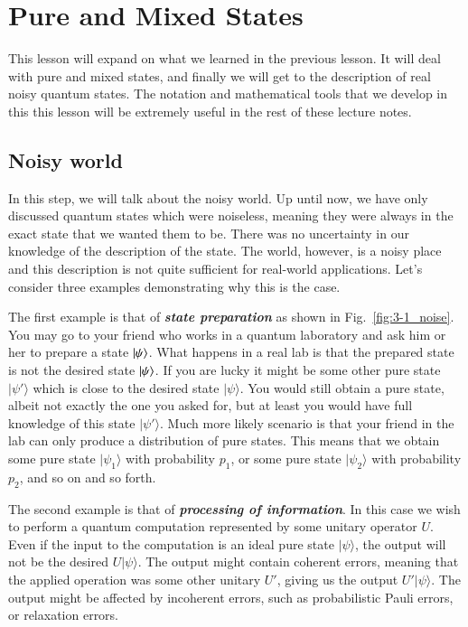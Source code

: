 \chapter[Pure and Mixed States]{Pure and Mixed States}
\label{sec:3_pure_mixed}

This lesson will expand on what we learned in the previous lesson.
It will deal with pure and mixed states, and finally we will get to the description of real noisy quantum states.
The notation and mathematical tools that we develop in this this lesson will be extremely useful in the rest of these lecture notes.

\section{Noisy world}
\label{sec:3-1_noisy_world}

In this step, we will talk about the noisy world.
Up until now, we have only discussed quantum states which were noiseless, meaning they
were always in the exact state that we wanted them to be.
There was no uncertainty in our knowledge of the description of the state.
The world, however, is a noisy place and this description is not quite sufficient for real-world applications.
Let's consider three examples demonstrating why this is the case.

The first example is that of \textit{\textbf{state preparation}} as shown in Fig.~\ref{fig:3-1_noise}.
You may go to your friend who works in a quantum laboratory and ask him or her to prepare
a state $\ket{\psi}$.
What happens in a real lab is that the prepared
state is not the desired state $\ket{\psi}$.
If you are lucky it might be some other pure state $|\psi'\rangle$ which is close to the desired state $|\psi\rangle$.
You would still obtain a pure state, albeit not exactly the one you asked for, but at least you would have full knowledge of this state $|\psi'\rangle$.
Much more likely scenario is that your friend in the lab can only produce a distribution of pure states.
This means that we obtain some pure state $|\psi_1\rangle$ with probability $p_1$, or some pure state $|\psi_2\rangle$ with probability $p_2$, and so on and so forth.

The second example is that of \textit{\textbf{processing of information}}.
In this case we wish to perform a quantum computation represented by some unitary operator $U$.
Even if the input to the computation is an ideal pure state $|\psi\rangle$, the output will not be the desired $U|\psi\rangle$.
The output might contain coherent errors, meaning that the applied operation was some other unitary $U'$, giving us the output $U'|\psi\rangle$.
The output might be affected by incoherent errors, such as probabilistic Pauli errors, or relaxation errors.

